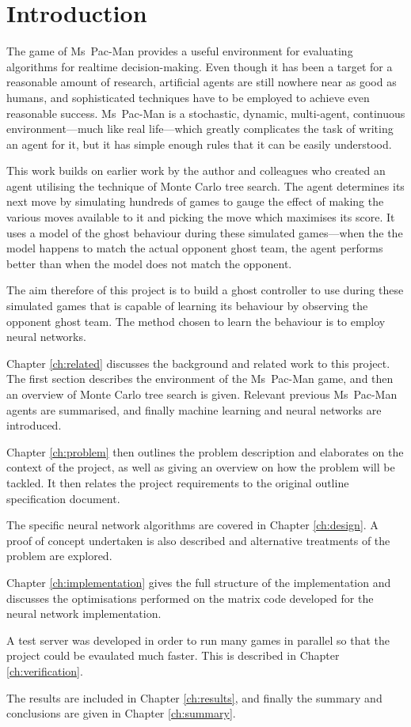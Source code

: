 \chapter{Introduction}
\label{ch:intro}

The game of Ms~Pac-Man provides a useful environment for evaluating algorithms for realtime decision-making.  Even though it has been a target for a reasonable amount of research, artificial agents are still nowhere near as good as humans, and sophisticated techniques have to be employed to achieve even reasonable success.  Ms~Pac-Man is a stochastic, dynamic, multi-agent, continuous environment---much like real life---which greatly complicates the task of writing an agent for it, but it has simple enough rules that it can be easily understood.

This work builds on earlier work by the author and colleagues who created an agent utilising the technique of Monte Carlo tree search.  The agent determines its next move by simulating hundreds of games to gauge the effect of making the various moves available to it and picking the move which maximises its score.  It uses a model of the ghost behaviour during these simulated games---when the the model happens to match the actual opponent ghost team, the agent performs better than when the model does not match the opponent.

The aim therefore of this project is to build a ghost controller to use during these simulated games that is capable of learning its behaviour by observing the opponent ghost team.  The method chosen to learn the behaviour is to employ neural networks.

Chapter \ref{ch:related} discusses the background and related work to this project.  The first section describes the environment of the Ms~Pac-Man game, and then an overview of Monte Carlo tree search is given.  Relevant previous Ms~Pac-Man agents are summarised, and finally machine learning and neural networks are introduced.

Chapter \ref{ch:problem} then outlines the problem description and elaborates on the context of the project, as well as giving an overview on how the problem will be tackled.  It then relates the project requirements to the original outline specification document.

The specific neural network algorithms are covered in Chapter \ref{ch:design}.  A proof of concept undertaken is also described and alternative treatments of the problem are explored.

Chapter \ref{ch:implementation} gives the full structure of the implementation and discusses the optimisations performed on the matrix code developed for the neural network implementation.

A test server was developed in order to run many games in parallel so that the project could be evaulated much faster.  This is described in Chapter \ref{ch:verification}.

The results are included in Chapter \ref{ch:results}, and finally the summary and conclusions are given in Chapter \ref{ch:summary}.
